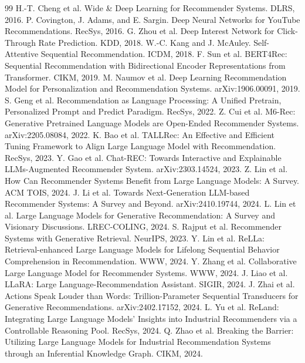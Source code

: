 \documentclass[UTF8,fontset=fandol,11pt]{ctexart}
\begin{document}
\begin{thebibliography}{99}
 H.-T. Cheng et al. Wide \& Deep Learning for Recommender Systems. DLRS, 2016.
 P. Covington, J. Adams, and E. Sargin. Deep Neural Networks for YouTube Recommendations. RecSys, 2016.
 G. Zhou et al. Deep Interest Network for Click-Through Rate Prediction. KDD, 2018.
 W.-C. Kang and J. McAuley. Self-Attentive Sequential Recommendation. ICDM, 2018.
 F. Sun et al. BERT4Rec: Sequential Recommendation with Bidirectional Encoder Representations from Transformer. CIKM, 2019.
 M. Naumov et al. Deep Learning Recommendation Model for Personalization and Recommendation Systems. arXiv:1906.00091, 2019.
 S. Geng et al. Recommendation as Language Processing: A Unified Pretrain, Personalized Prompt and Predict Paradigm. RecSys, 2022.
 Z. Cui et al. M6-Rec: Generative Pretrained Language Models are Open-Ended Recommender Systems. arXiv:2205.08084, 2022.
 K. Bao et al. TALLRec: An Effective and Efficient Tuning Framework to Align Large Language Model with Recommendation. RecSys, 2023.
 Y. Gao et al. Chat-REC: Towards Interactive and Explainable LLMs-Augmented Recommender System. arXiv:2303.14524, 2023.
 Z. Lin et al. How Can Recommender Systems Benefit from Large Language Models: A Survey. ACM TOIS, 2024.
 J. Li et al. Towards Next-Generation LLM-based Recommender Systems: A Survey and Beyond. arXiv:2410.19744, 2024.
 L. Lin et al. Large Language Models for Generative Recommendation: A Survey and Visionary Discussions. LREC-COLING, 2024.
 S. Rajput et al. Recommender Systems with Generative Retrieval. NeurIPS, 2023.
 Y. Lin et al. ReLLa: Retrieval-enhanced Large Language Models for Lifelong Sequential Behavior Comprehension in Recommendation. WWW, 2024.
 Y. Zhang et al. Collaborative Large Language Model for Recommender Systems. WWW, 2024.
 J. Liao et al. LLaRA: Large Language-Recommendation Assistant. SIGIR, 2024.
 J. Zhai et al. Actions Speak Louder than Words: Trillion-Parameter Sequential Transducers for Generative Recommendations. arXiv:2402.17152, 2024.
 L. Yu et al. ReLand: Integrating Large Language Models' Insights into Industrial Recommenders via a Controllable Reasoning Pool. RecSys, 2024.
 Q. Zhao et al. Breaking the Barrier: Utilizing Large Language Models for Industrial Recommendation Systems through an Inferential Knowledge Graph. CIKM, 2024.

\end{thebibliography}
\end{document}
